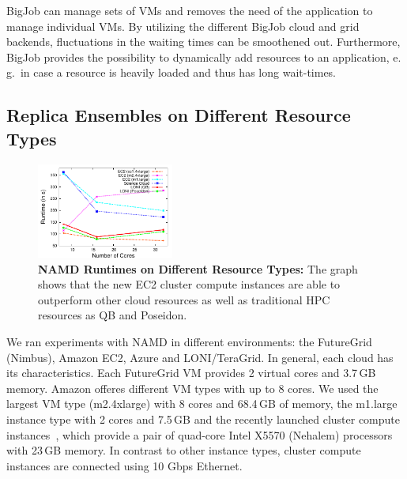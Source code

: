 \documentclass[conference,final]{IEEEtran}
\newcommand{\up}{\vspace*{-1em}}
\begin{document}
BigJob can manage sets of VMs and removes the need of the application
to manage individual VMs. By utilizing the different BigJob cloud and
grid backends, fluctuations in the waiting times can be smoothened
out. Furthermore, BigJob provides the possibility to dynamically add
resources to an application, e.\,g.\ in case a resource is heavily
loaded and thus has long wait-times.



\subsection{Replica Ensembles on Different Resource Types}
\up
\label{sec:performance_namd}

\begin{figure}[t]
    \centering
        \includegraphics[width=0.4\textwidth]{performance/namd_run}
    \caption{\textbf{NAMD Runtimes on Different Resource Types: } The
          graph shows that the new EC2 cluster compute instances are 
          able to outperform other cloud resources as well as traditional
          HPC resources as QB and Poseidon.\up}
    \label{fig:performance_namd_run}

\end{figure}

We ran experiments with NAMD in different environments: the FutureGrid (Nimbus),
Amazon EC2, Azure and LONI/TeraGrid. 
In general, each cloud has its characteristics. 
Each FutureGrid VM provides 2 virtual cores and 3.7\,GB memory. 
Amazon offeres different VM types with up to 8 cores. We used the largest 
VM type (m2.4xlarge) with 8 cores and 68.4\,GB of memory,
the m1.large instance type with 2 cores and 7.5\,GB  and the recently launched
cluster compute instances~\cite{ec2-cc}, which provide a pair of quad-core Intel 
X5570 (Nehalem) processors with 23\,GB memory. In contrast to other instance types,
cluster compute instances are connected using 10 Gbps Ethernet.
\end{document}
